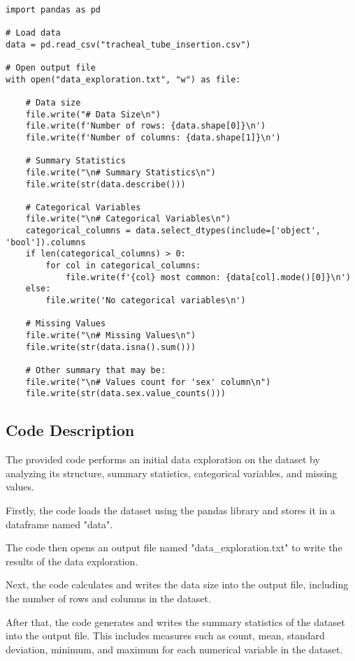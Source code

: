 \documentclass[11pt]{article}
\begin{document}
\begin{verbatim}

import pandas as pd

# Load data
data = pd.read_csv("tracheal_tube_insertion.csv")

# Open output file
with open("data_exploration.txt", "w") as file:

    # Data size
    file.write("# Data Size\n")
    file.write(f'Number of rows: {data.shape[0]}\n')
    file.write(f'Number of columns: {data.shape[1]}\n')

    # Summary Statistics
    file.write("\n# Summary Statistics\n")
    file.write(str(data.describe()))

    # Categorical Variables
    file.write("\n# Categorical Variables\n")
    categorical_columns = data.select_dtypes(include=['object', 'bool']).columns
    if len(categorical_columns) > 0:
        for col in categorical_columns:
            file.write(f'{col} most common: {data[col].mode()[0]}\n')
    else:
        file.write('No categorical variables\n')

    # Missing Values
    file.write("\n# Missing Values\n")
    file.write(str(data.isna().sum()))

    # Other summary that may be:
    file.write("\n# Values count for 'sex' column\n")
    file.write(str(data.sex.value_counts()))

\end{verbatim}

\subsection{Code Description}

The provided code performs an initial data exploration on the dataset by analyzing its structure, summary statistics, categorical variables, and missing values. 

Firstly, the code loads the dataset using the pandas library and stores it in a dataframe named "data".

The code then opens an output file named "data\_exploration.txt" to write the results of the data exploration.

Next, the code calculates and writes the data size into the output file, including the number of rows and columns in the dataset.

After that, the code generates and writes the summary statistics of the dataset into the output file. This includes measures such as count, mean, standard deviation, minimum, and maximum for each numerical variable in the dataset.
\end{document}
